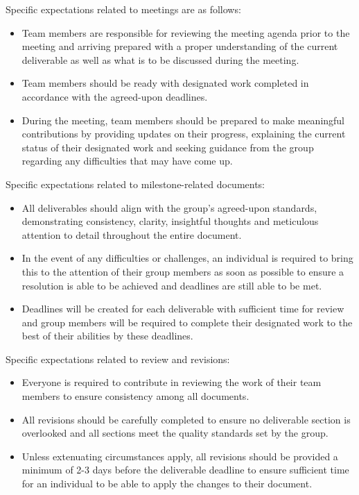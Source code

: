 \documentclass{article}
\begin{document}
Specific expectations related to meetings are as follows:
\begin{itemize}
    \item Team members are responsible for reviewing the meeting agenda prior to the meeting and arriving prepared
    with a proper understanding of the current deliverable as well as what is to be discussed during the meeting.
    \item Team members should be ready with designated work completed in accordance with the agreed-upon deadlines.
    \item During the meeting, team members should be prepared to make meaningful contributions by providing updates
    on their progress, explaining the current status of their designated work and seeking guidance from the group
    regarding any  difficulties that may have come up.
\end{itemize}

Specific expectations related to milestone-related documents:
\begin{itemize}
    \item All deliverables should align with the group’s agreed-upon standards, demonstrating consistency, clarity,
    insightful thoughts and meticulous attention to detail throughout the entire document.
    \item In the event of any difficulties or challenges, an individual is required to bring this to the attention
    of their group members as soon as possible to ensure a resolution is able to be achieved and deadlines are still able to be met.
    \item Deadlines will be created for each deliverable with sufficient time for review and group members will be
    required to complete their designated work to the best of their abilities by these deadlines.
\end{itemize}

Specific expectations related to review and revisions:
\begin{itemize}
    \item Everyone is required to contribute in reviewing the work of their team members to ensure consistency among
    all documents.
    \item All revisions should be carefully completed to ensure no deliverable section is overlooked and all
    sections meet the quality standards set by the group.
    \item Unless extenuating circumstances apply, all revisions should be provided a minimum of 2-3 days before the
    deliverable deadline to ensure sufficient time for an individual to be able to apply the changes to their document.
\end{itemize}
\end{document}
